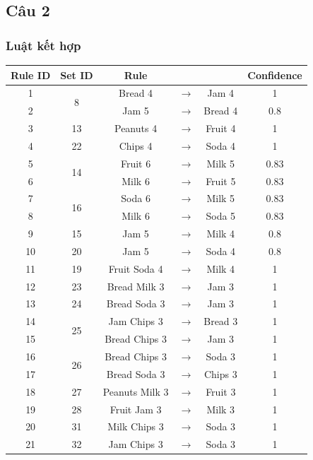 \documentclass{article}
\begin{document}
\subsection{Câu 2}
\subsubsection{Luật kết hợp}
\begin{table}[H]
\begin{longtable}{|c | c | c  c  c | c|}
	
	\hline
    Rule ID & Set ID & Rule &&& Confidence\\
    \hline
	1 & \multirow{2}{*}{8}&Bread 4 & $\to$ & Jam 4& 1\\ 
	2 & &Jam 5 & $\to$ & Bread 4& 0.8\\ \hline	
	3 & 13&Peanuts 4 & $\to$ & Fruit 4& 1\\ \hline	
	4 & 22&Chips 4 & $\to$ & Soda 4& 1\\ \hline	
	5 & \multirow{2}{*}{14}&Fruit 6 & $\to$ & Milk 5& 0.83\\
	6 & &Milk 6 & $\to$ & Fruit 5& 0.83\\ \hline	
	7 & \multirow{2}{*}{16}&Soda 6 & $\to$ & Milk 5& 0.83\\
	8 & &Milk 6 & $\to$ & Soda 5& 0.83\\ \hline	
	9 & 15&Jam 5 & $\to$ & Milk 4& 0.8\\ \hline	
	10& 20&Jam 5 & $\to$ & Soda 4& 0.8\\ \hline	
	11& 19&Fruit Soda 4 & $\to$ & Milk 4& 1\\ \hline	
	12& 23&Bread Milk 3 & $\to$ & Jam 3& 1\\ \hline	
	13& 24&Bread Soda 3 & $\to$ & Jam 3& 1\\ \hline	
	14& \multirow{2}{*}{25}&Jam Chips 3 & $\to$ & Bread 3& 1\\
	15& &Bread Chips 3 & $\to$ & Jam 3& 1\\	\hline
	16& \multirow{2}{*}{26}&Bread Chips 3 & $\to$ & Soda 3& 1\\
	17& &Bread Soda 3 & $\to$ & Chips 3& 1\\ \hline	
	18& 27&Peanuts Milk 3 & $\to$ & Fruit 3& 1\\ \hline
	19& 28&Fruit Jam 3 & $\to$ & Milk 3& 1\\ \hline	
	20& 31&Milk Chips 3 & $\to$ & Soda 3& 1\\ \hline	
	21& 32&Jam Chips 3 & $\to$ & Soda 3& 1\\ \hline	

\end{longtable}
\end{table}
\end{document}
